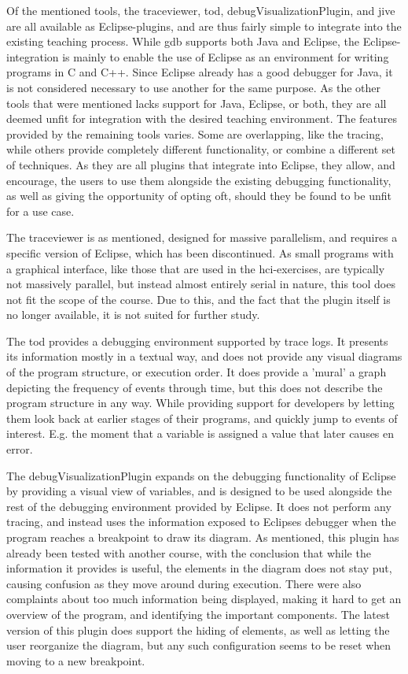 Of the mentioned tools, the \gls{traceviewer}, \gls{tod}, \gls{debugVisualizationPlugin}, and \gls{jive} are all available as Eclipse-plugins, and are thus fairly simple to integrate into the existing teaching process.
While \gls{gdb} supports both Java and Eclipse, the Eclipse-integration is mainly to enable the use of Eclipse as an environment for writing programs in C and C++.
Since Eclipse already has a good debugger for Java, it is not considered necessary to use another for the same purpose.
As the other tools that were mentioned lacks support for Java, Eclipse, or both, they are all deemed unfit for integration with the desired teaching environment.
The features provided by the remaining tools varies.
Some are overlapping, like the tracing, while others provide completely different functionality, or combine a different set of techniques.
As they are all plugins that integrate into Eclipse, they allow, and encourage, the users to use them alongside the existing debugging functionality, as well as giving the opportunity of opting oft, should they be found to be unfit for a use case.

The \gls{traceviewer} is as mentioned, designed for massive parallelism, and requires a specific version of Eclipse, which has been discontinued.
As small programs with a graphical interface, like those that are used in the \gls{hci}-exercises, are typically not massively parallel, but instead almost entirely serial in nature, this tool does not fit the scope of the course.
Due to this, and the fact that the plugin itself is no longer available, it is not suited for further study.

The \gls{tod} provides a debugging environment supported by trace logs.
It presents its information mostly in a textual way, and does not provide any visual diagrams of the program structure, or execution order.
It does provide a 'mural' a graph depicting the frequency of events through time, but this does not describe the program structure in any way.
While providing support for developers by letting them look back at earlier stages of their programs, and quickly jump to events of interest.
E.g. the moment that a variable is assigned a value that later causes en error.

The \gls{debugVisualizationPlugin} expands on the debugging functionality of Eclipse by providing a visual view of variables, and is designed to be used alongside the rest of the debugging environment provided by Eclipse.
It does not perform any tracing, and instead uses the information exposed to Eclipses debugger when the program reaches a breakpoint to draw its diagram.
As mentioned, this plugin has already been tested with another course, with the conclusion that while the information it provides is useful, the elements in the diagram does not stay put, causing confusion as they move around during execution.
There were also complaints about too much information being displayed, making it hard to get an overview of the program, and identifying the important components.
The latest version of this plugin does support the hiding of elements, as well as letting the user reorganize the diagram, but any such configuration seems to be reset when moving to a new breakpoint.

